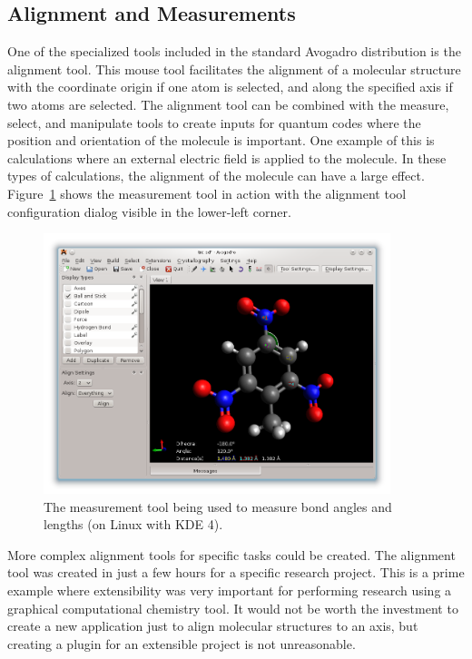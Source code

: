\documentclass[10pt]{bmc_article}
\newenvironment{bmcformat}{\begin{raggedright}
\baselineskip20pt\sloppy\setboolean{publ}{false}}{\end{raggedright}
\baselineskip20pt\sloppy}
\begin{document}
\begin{bmcformat}
\subsection{Alignment and Measurements}

One of the specialized tools included in the standard Avogadro distribution is
the alignment tool. This mouse tool facilitates the alignment of a molecular
structure with the coordinate origin if one atom is selected, and along the
specified axis if two atoms are selected. The alignment tool can be combined
with the measure, select, and manipulate tools to create inputs for
quantum codes where the position and orientation of the molecule is important.
One example of this is calculations where an external electric field is applied
to the molecule. In these types of calculations, the alignment of the molecule
can have a large effect. Figure~\ref{f:measurement} shows the measurement tool
in action with the alignment tool configuration dialog visible in the lower-left
corner.

\begin{figure}
  \begin{center}
    \includegraphics[width=0.9\textwidth]{images/avogadro-measurement}
  \end{center}
  \caption{The measurement tool being used to measure bond angles and lengths
  (on Linux with KDE 4).}
  \label{f:measurement}
\end{figure}

More complex alignment tools for specific tasks could be created. The alignment
tool was created in just a few hours for a specific research project. This is a prime
example where extensibility was very important for performing
research using a graphical computational chemistry tool. It would not be
worth the investment to create a new application just to align molecular
structures to an axis, but creating a plugin for an extensible project is not
unreasonable.



\end{bmcformat}
\end{document}
